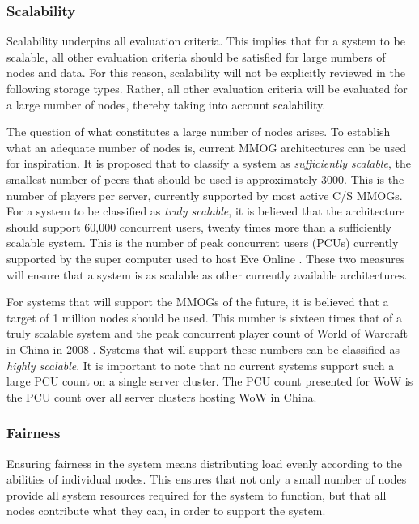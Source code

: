 \documentclass[10pt,a4paper,journal,cspaper,compsoc]{IEEEtran}
\begin{document}
\subsubsection{Scalability}
Scalability underpins all evaluation criteria. This implies that for a system to be scalable, all other evaluation criteria should be satisfied for
large numbers of nodes and data. For this reason, scalability will not be explicitly reviewed in the following storage types. Rather, all other
evaluation criteria will be evaluated for a large number of nodes, thereby taking into account scalability.

The question of what constitutes a large number of nodes arises. To establish what an adequate number of nodes is, current MMOG architectures can be
used for inspiration. It is proposed that to classify a system as \emph{sufficiently scalable}, the smallest number of peers that should be used is
approximately 3000. This is the number of players per server, currently supported by most active C/S MMOGs. For a system to be classified as
\emph{truly scalable}, it is believed that the architecture should support 60,000 concurrent users, twenty times more than a sufficiently scalable
system. This is the number of peak concurrent users (PCUs) currently supported by the super computer used to host Eve Online \cite{eve_pcu}. These
two measures will ensure that a system is as scalable as other currently available architectures.

For systems that will support the MMOGs of the future, it is believed that a target of 1 million nodes should be used. This number is sixteen times
that of a truly scalable system and the peak concurrent player count of World of Warcraft in China in 2008 \cite{WoW_china_pcu}. Systems that will
support these numbers can be classified as \emph{highly scalable}. It is important to note that no current systems support such a large PCU count on
a single server cluster. The PCU count presented for WoW is the PCU count over all server clusters hosting WoW in China.

\subsubsection{Fairness}
Ensuring fairness in the system means distributing load evenly according to the abilities of individual nodes. This ensures that not only a small
number of nodes provide all system resources required for the system to function, but that all nodes contribute what they can, in order to support
the system.
\end{document}
